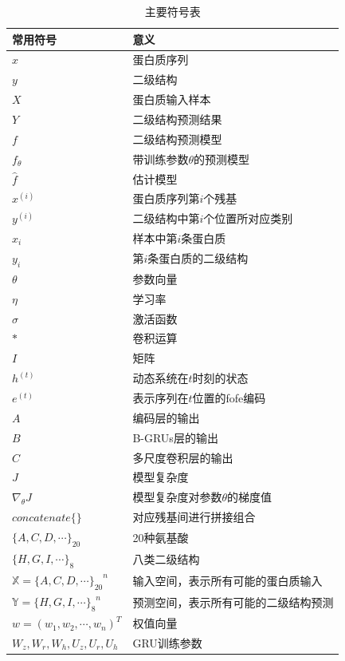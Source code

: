 \documentclass[a4paper, tikz]{article}
\begin{document}
\begin{table}[p]
\renewcommand\arraystretch{1.2}
\caption{主要符号表}
\center
\begin{tabular}{p{120pt}<{\centering} p{280pt}<{\centering}}
\toprule
常用符号& 意义\\
\midrule
$x$ & 蛋白质序列\\
$y$ & 二级结构\\
$X$ & 蛋白质输入样本\\
$Y$ & 二级结构预测结果\\
$f$ & 二级结构预测模型\\
$f_{\theta}$ & 带训练参数$\theta$的预测模型\\
$\hat{f}$ & 估计模型\\
$x^{(i)}$ & 蛋白质序列第$i$个残基\\
$y^{(i)}$ & 二级结构中第$i$个位置所对应类别\\
$x_i$ & 样本中第$i$条蛋白质\\
$y_i$ & 第$i$条蛋白质的二级结构\\
$\theta$ & 参数向量\\
$\eta$ & 学习率\\
$\sigma$ & 激活函数\\
$*$ & 卷积运算\\
$I$ & 矩阵\\
$h^{(t)}$ & 动态系统在$t$时刻的状态\\
$e^{(t)}$ & 表示序列在$t$位置的fofe编码\\
$A$ & 编码层的输出\\
$B$ & B-GRUs层的输出\\
$C$ & 多尺度卷积层的输出\\
$J$ & 模型复杂度\\
$\nabla_{\theta} J$ & 模型复杂度对参数$\theta$的梯度值\\
$concatenate\{\}$ & 对应残基间进行拼接组合\\
$\{A,C,D,\cdots\}_{20}$ & 20种氨基酸\\
$\{H,G,I,\cdots\}_{8}$ & 八类二级结构\\
$\mathbb{X}={\{A,C,D,\cdots\}_{20}}^n$ & 输入空间，表示所有可能的蛋白质输入\\
$\mathbb{Y}={\{H,G,I,\cdots\}_{8}}^n$ & 预测空间，表示所有可能的二级结构预测\\
$w=(w_1,w_2,\cdots,w_n)^T$ & 权值向量\\
$W_z,W_r,W_h,U_z,U_r,U_h$ & GRU训练参数\\
\bottomrule
\end{tabular}
\end{table}
\end{document}
